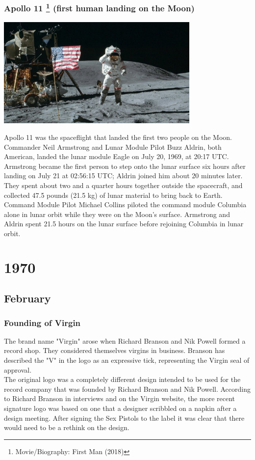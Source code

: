 \documentclass[11pt]{report}
\begin{document}
\subsection{Apollo 11 \protect\footnote{Movie/Biography: First Man (2018)} (first human landing on the Moon)}
\vspace{2mm}\begin{center}\includegraphics[width=10cm]{./img/apollo11.jpg}\end{center}
Apollo 11 was the spaceflight that landed the first two people on the Moon. Commander Neil Armstrong and Lunar Module Pilot Buzz Aldrin, both American, landed the lunar module Eagle on July 20, 1969, at 20:17 UTC. Armstrong became the first person to step onto the lunar surface six hours after landing on July 21 at 02:56:15 UTC; Aldrin joined him about 20 minutes later. They spent about two and a quarter hours together outside the spacecraft, and collected 47.5 pounds (21.5 kg) of lunar material to bring back to Earth. Command Module Pilot Michael Collins piloted the command module Columbia alone in lunar orbit while they were on the Moon's surface. Armstrong and Aldrin spent 21.5 hours on the lunar surface before rejoining Columbia in lunar orbit.

\chapter{1970}
\section{February}
\subsection{Founding of Virgin}
The brand name "Virgin" arose when Richard Branson and Nik Powell formed a record shop. They considered themselves virgins in business. Branson has described the "V" in the logo as an expressive tick, representing the Virgin seal of approval.\\ \indent The original logo was a completely different design intended to be used for the record company that was founded by Richard Branson and Nik Powell. According to Richard Branson in interviews and on the Virgin website, the more recent signature logo was based on one that a designer scribbled on a napkin after a design meeting. After signing the Sex Pistols to the label it was clear that there would need to be a rethink on the design.
\end{document}
